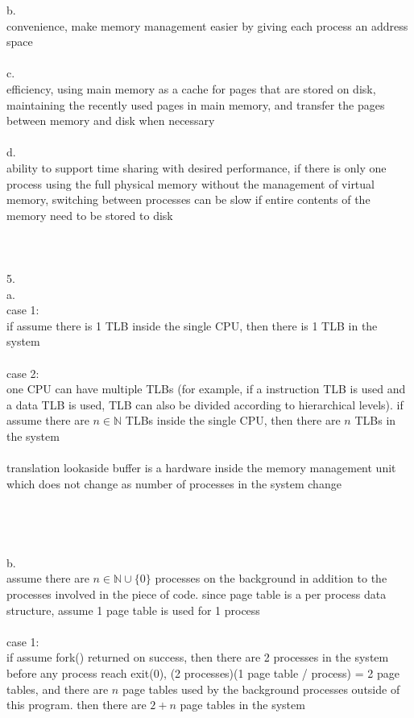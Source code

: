 \documentclass[12pt, border = 4pt, multi]{article} %
\begin{document}
b.\\
convenience, make memory management easier by giving each process an address space\\
\\
c.\\
efficiency, using main memory as a cache for pages that are stored on disk, maintaining the recently used pages in main memory, and transfer the pages between memory and disk when necessary\\
\\
d.\\
ability to support time sharing with desired performance, if there is only one process using the full physical memory without the management of virtual memory, switching between processes can be slow if entire contents of the memory need to be stored to disk\\
\\
\\
\\
5.\\
a.\\
case 1:\\
if assume there is 1 TLB inside the single CPU, then there is 1 TLB in the system\\
\\
case 2:\\
one CPU can have multiple TLBs (for example, if a instruction TLB is used and a data TLB is used, TLB can also be divided according to hierarchical levels). if assume there are $n \in \mathbb{N}$ TLBs inside the single CPU, then there are $n$ TLBs in the system\\
\\
translation lookaside buffer is a hardware inside the memory management unit which does not change as number of processes in the system change\\
\\
\\
\\
\\
b.\\
assume there are $n \in \mathbb{N} \cup \{0\}$ processes on the background in addition to the processes involved in the piece of code. since page table is a per process data structure, assume 1 page table is used for 1 process\\
\\
case 1:\\
if assume fork() returned on success, then there are 2 processes in the system before any process reach exit(0), (2 processes)(1 page table / process) = 2 page tables, and there are $n$ page tables used by the background processes outside of this program. then there are $2 + n$ page tables in the system\\
\end{document}
